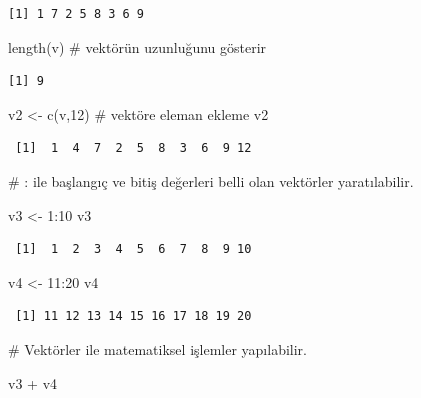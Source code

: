 \documentclass[
  letterpaper,
  DIV=11,
  numbers=noendperiod]{scrreprt}
\newenvironment{Shaded}{\begin{snugshade}}{\end{snugshade}}
\newcommand{\CommentTok}[1]{\textcolor[rgb]{0.37,0.37,0.37}{#1}}
\newcommand{\DecValTok}[1]{\textcolor[rgb]{0.68,0.00,0.00}{#1}}
\newcommand{\FunctionTok}[1]{\textcolor[rgb]{0.28,0.35,0.67}{#1}}
\newcommand{\NormalTok}[1]{\textcolor[rgb]{0.00,0.23,0.31}{#1}}
\newcommand{\OtherTok}[1]{\textcolor[rgb]{0.00,0.23,0.31}{#1}}
\newcommand{\SpecialCharTok}[1]{\textcolor[rgb]{0.37,0.37,0.37}{#1}}
\begin{document}
\begin{verbatim}
[1] 1 7 2 5 8 3 6 9
\end{verbatim}

\begin{Shaded}
\begin{Highlighting}[]
\FunctionTok{length}\NormalTok{(v) }\CommentTok{\# vektörün uzunluğunu gösterir}
\end{Highlighting}
\end{Shaded}

\begin{verbatim}
[1] 9
\end{verbatim}

\begin{Shaded}
\begin{Highlighting}[]
\NormalTok{v2 }\OtherTok{\textless{}{-}} \FunctionTok{c}\NormalTok{(v,}\DecValTok{12}\NormalTok{) }\CommentTok{\# vektöre eleman ekleme}
\NormalTok{v2}
\end{Highlighting}
\end{Shaded}

\begin{verbatim}
 [1]  1  4  7  2  5  8  3  6  9 12
\end{verbatim}

\begin{Shaded}
\begin{Highlighting}[]
\CommentTok{\# : ile başlangıç ve bitiş değerleri belli olan vektörler yaratılabilir.}

\NormalTok{v3 }\OtherTok{\textless{}{-}} \DecValTok{1}\SpecialCharTok{:}\DecValTok{10}
\NormalTok{v3}
\end{Highlighting}
\end{Shaded}

\begin{verbatim}
 [1]  1  2  3  4  5  6  7  8  9 10
\end{verbatim}

\begin{Shaded}
\begin{Highlighting}[]
\NormalTok{v4 }\OtherTok{\textless{}{-}} \DecValTok{11}\SpecialCharTok{:}\DecValTok{20}
\NormalTok{v4}
\end{Highlighting}
\end{Shaded}

\begin{verbatim}
 [1] 11 12 13 14 15 16 17 18 19 20
\end{verbatim}

\begin{Shaded}
\begin{Highlighting}[]
\CommentTok{\# Vektörler ile matematiksel işlemler yapılabilir.}

\NormalTok{v3 }\SpecialCharTok{+}\NormalTok{ v4}
\end{Highlighting}
\end{Shaded}
\end{document}
